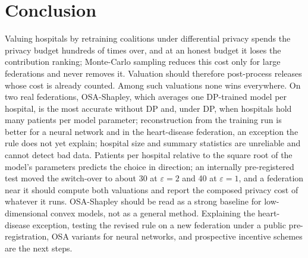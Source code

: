 \documentclass[journal]{IEEEtran}
\begin{document}
\section{Conclusion}
\label{sec:conclusion}
Valuing hospitals by retraining coalitions under differential privacy spends the privacy budget hundreds of times over, and at an honest budget it loses the contribution ranking; Monte-Carlo sampling reduces this cost only for large federations and never removes it. Valuation should therefore post-process releases whose cost is already counted. Among such valuations none wins everywhere. On two real federations, OSA-Shapley, which averages one DP-trained model per hospital, is the most accurate without DP and, under DP, when hospitals hold many patients per model parameter; reconstruction from the training run is better for a neural network and in the heart-disease federation, an exception the rule does not yet explain; hospital size and summary statistics are unreliable and cannot detect bad data. Patients per hospital relative to the square root of the model's parameters predicts the choice in direction; an internally pre-registered test moved the switch-over to about 30 at $\varepsilon=2$ and 40 at $\varepsilon=1$, and a federation near it should compute both valuations and report the composed privacy cost of whatever it runs. OSA-Shapley should be read as a strong baseline for low-dimensional convex models, not as a general method. Explaining the heart-disease exception, testing the revised rule on a new federation under a public pre-registration, OSA variants for neural networks, and prospective incentive schemes are the next steps.



\end{document}
